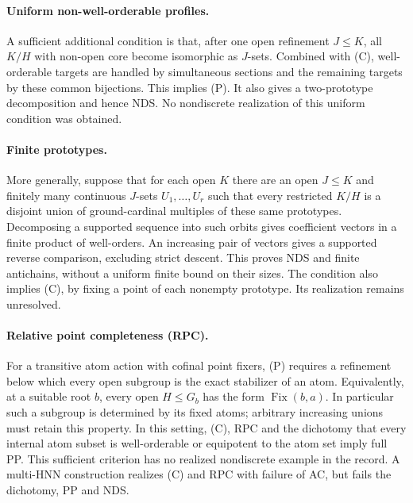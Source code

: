 \paragraph{Uniform non-well-orderable profiles.}
A sufficient additional condition is that, after one open refinement $J\leq K$, all $K/H$ with non-open core become isomorphic as $J$-sets. Combined with (C), well-orderable targets are handled by simultaneous sections and the remaining targets by these common bijections. This implies (P). It also gives a two-prototype decomposition and hence NDS. No nondiscrete realization of this uniform condition was obtained.

\paragraph{Finite prototypes.}
More generally, suppose that for each open $K$ there are an open $J\leq K$ and finitely many continuous $J$-sets $U_1,\ldots,U_r$ such that every restricted $K/H$ is a disjoint union of ground-cardinal multiples of these same prototypes. Decomposing a supported sequence into such orbits gives coefficient vectors in a finite product of well-orders. An increasing pair of vectors gives a supported reverse comparison, excluding strict descent. This proves NDS and finite antichains, without a uniform finite bound on their sizes. The condition also implies (C), by fixing a point of each nonempty prototype. Its realization remains unresolved.

\paragraph{Relative point completeness (RPC).}
For a transitive atom action with cofinal point fixers, (P) requires a refinement below which every open subgroup is the exact stabilizer of an atom. Equivalently, at a suitable root $b$, every open $H\leq G_b$ has the form $\operatorname{Fix}(b,a)$. In particular such a subgroup is determined by its fixed atoms; arbitrary increasing unions must retain this property. In this setting, (C), RPC and the dichotomy that every internal atom subset is well-orderable or equipotent to the atom set imply full PP. This sufficient criterion has no realized nondiscrete example in the record. A multi-HNN construction realizes (C) and RPC with failure of AC, but fails the dichotomy, PP and NDS.

